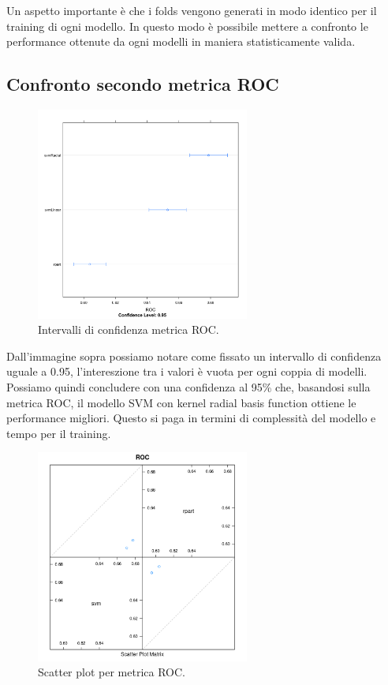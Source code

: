 Un aspetto importante è che i folds vengono generati in modo identico
per il training di ogni modello. In questo modo è possibile mettere a
confronto le performance ottenute da ogni modelli in maniera
statisticamente valida.

\subsection{Confronto secondo metrica ROC}

\begin{figure}[H]
	\centering
	\includegraphics[width=7cm]{../images/compare_dot_plot.png}
	\caption{Intervalli di confidenza metrica ROC.}
	\label{fig:compare_dot_plot}
\end{figure}
Dall'immagine sopra possiamo notare come fissato un intervallo di confidenza uguale a 0.95, l'intereszione tra i valori è vuota per ogni coppia di modelli. Possiamo quindi concludere con una confidenza al 95\% che, basandosi sulla metrica ROC, il modello SVM con kernel radial basis function ottiene le performance migliori. Questo si paga in termini di complessità del modello e tempo per il training.

\begin{figure}[H]
	\centering
	\includegraphics[width=7cm]{../images/compare_splom_plot.png}
	\caption{Scatter plot per metrica ROC.}
	\label{fig:compare_splom_plot}
\end{figure}

